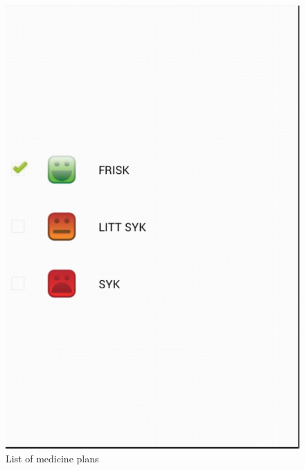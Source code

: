 \begin{figure}
\begin{minipage}[b]{0.4\linewidth}
			\includegraphics[width=0.20\paperwidth]{Pictures/app-screenshots/medicine_plan.png}
		\caption{List of medicine plans}
		\label{fig:edit_medicine_plan}
	\end{minipage}
		\begin{minipage}[b]{0.4\linewidth}
		\centering

\end{minipage}
\end{figure}
